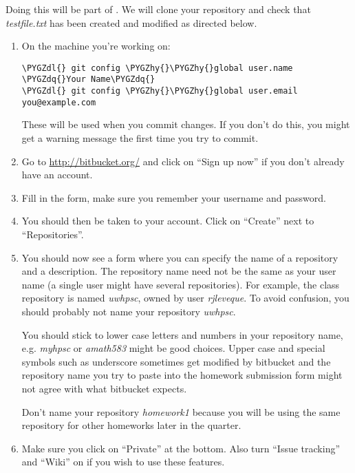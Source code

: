 \documentclass[letterpaper,10pt,english]{sphinxmanual}
\def\PYGZdl{\char`\$}
\def\PYGZhy{\char`\-}
\def\PYGZdq{\char`\"}
\begin{document}
Doing this will be part of .
We will clone your repository and check that \emph{testfile.txt} has been created
and modified as directed below.
\begin{enumerate}
\item {} 
On the machine you're working on:

\begin{Verbatim}[commandchars=\\\{\}]
\PYGZdl{} git config \PYGZhy{}\PYGZhy{}global user.name \PYGZdq{}Your Name\PYGZdq{}
\PYGZdl{} git config \PYGZhy{}\PYGZhy{}global user.email you@example.com
\end{Verbatim}

These will be used when you commit changes.
If you don't do this, you might get a warning message
the first time you try to commit.

\item {} 
Go to \url{http://bitbucket.org/} and click on ``Sign up now'' if you don't
already have an account.

\item {} 
Fill in the form, make sure you remember your username and password.

\item {} 
You should then be taken to your account.  Click on ``Create'' next
to ``Repositories''.

\item {} 
You should now see a form where you can specify the name of a repository
and a description.  The repository name need not be the same as your user
name (a single user might have several repositories).  For example, the class
repository is named \emph{uwhpsc}, owned by user \emph{rjleveque}.
To avoid confusion, you should probably not name your repository
\emph{uwhpsc}.

You should stick to lower case letters and numbers in your repository
name, e.g. \emph{myhpsc} or \emph{amath583} might be good choices.  Upper case and
special symbols such as underscore sometimes get modified by bitbucket
and the repository name you try to paste into the homework submission
form might not agree with what bitbucket expects.

Don't name your repository \emph{homework1} because you will be using the
same repository for other homeworks later in the quarter.

\item {} 
Make sure you click on ``Private'' at the bottom.  Also turn ``Issue
tracking'' and ``Wiki'' on if you wish to use these features.


\end{enumerate}
\end{document}
